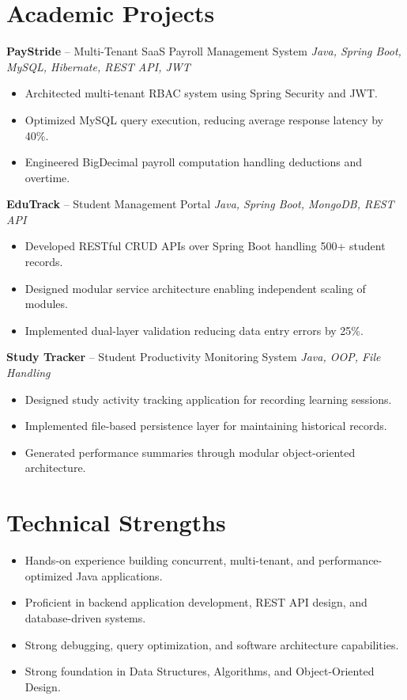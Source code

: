 \documentclass[10.5pt,a4paper]{article}
\begin{document}
\section{Academic Projects}
\textbf{PayStride} -- Multi-Tenant SaaS Payroll Management System \hfill \textit{Java, Spring Boot, MySQL, Hibernate, REST API, JWT}
\begin{itemize}
  \item Architected multi-tenant RBAC system using Spring Security and JWT.
  \item Optimized MySQL query execution, reducing average response latency by 40\%.
  \item Engineered BigDecimal payroll computation handling deductions and overtime.
\end{itemize}
\vspace{4pt}
\textbf{EduTrack} -- Student Management Portal \hfill \textit{Java, Spring Boot, MongoDB, REST API}
\begin{itemize}
  \item Developed RESTful CRUD APIs over Spring Boot handling 500+ student records.
  \item Designed modular service architecture enabling independent scaling of modules.
  \item Implemented dual-layer validation reducing data entry errors by 25\%.
\end{itemize}
\vspace{4pt}
\textbf{Study Tracker} -- Student Productivity Monitoring System \hfill \textit{Java, OOP, File Handling}
\begin{itemize}
  \item Designed study activity tracking application for recording learning sessions.
  \item Implemented file-based persistence layer for maintaining historical records.
  \item Generated performance summaries through modular object-oriented architecture.
\end{itemize}
\section{Technical Strengths}
\begin{itemize}
  \item Hands-on experience building concurrent, multi-tenant, and performance-optimized Java applications.
  \item Proficient in backend application development, REST API design, and database-driven systems.
  \item Strong debugging, query optimization, and software architecture capabilities.
  \item Strong foundation in Data Structures, Algorithms, and Object-Oriented Design.
\end{itemize}
\end{document}
